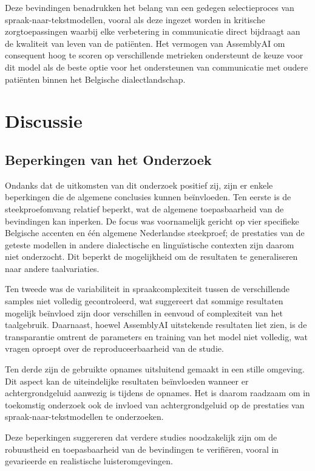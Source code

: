 Deze bevindingen benadrukken het belang van een gedegen selectieproces van spraak-naar-tekstmodellen, vooral als deze ingezet worden in kritische zorgtoepassingen waarbij elke verbetering in communicatie direct bijdraagt aan de kwaliteit van leven van de patiënten. Het vermogen van AssemblyAI om consequent hoog te scoren op verschillende metrieken ondersteunt de keuze voor dit model als de beste optie voor het ondersteunen van communicatie met oudere patiënten binnen het Belgische dialectlandschap. 
\section{Discussie}

\subsection{Beperkingen van het Onderzoek}

Ondanks dat de uitkomsten van dit onderzoek positief zij, zijn er enkele beperkingen die de algemene conclusies kunnen beïnvloeden. Ten eerste is de steekproefomvang relatief beperkt, wat de algemene toepasbaarheid van de bevindingen kan inperken. De focus was voornamelijk gericht op vier specifieke Belgische accenten en één algemene Nederlandse steekproef; de prestaties van de geteste modellen in andere dialectische en linguïstische contexten zijn daarom niet onderzocht. Dit beperkt de mogelijkheid om de resultaten te generaliseren naar andere taalvariaties.

Ten tweede was de variabiliteit in spraakcomplexiteit tussen de verschillende samples niet volledig gecontroleerd, wat suggereert dat sommige resultaten mogelijk beïnvloed zijn door verschillen in eenvoud of complexiteit van het taalgebruik. Daarnaast, hoewel AssemblyAI uitstekende resultaten liet zien, is de transparantie omtrent de parameters en training van het model niet volledig, wat vragen oproept over de reproduceerbaarheid van de studie.

Ten derde zijn de gebruikte opnames uitsluitend gemaakt in een stille omgeving. Dit aspect kan de uiteindelijke resultaten beïnvloeden wanneer er achtergrondgeluid aanwezig is tijdens de opnames. Het is daarom raadzaam om in toekomstig onderzoek ook de invloed van achtergrondgeluid op de prestaties van spraak-naar-tekstmodellen te onderzoeken.

Deze beperkingen suggereren dat verdere studies noodzakelijk zijn om de robuustheid en toepasbaarheid van de bevindingen te verifiëren, vooral in gevarieerde en realistische luisteromgevingen.
 
